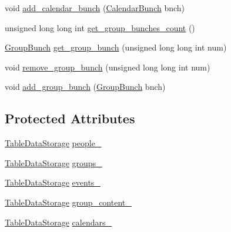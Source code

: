 \begin{DoxyCompactItemize}
void \hyperlink{classstorage_1_1DataStorage_ac7b4152086292d6a2b88d633c938140d}{add\_\-calendar\_\-bunch} (\hyperlink{structstorage_1_1CalendarBunch__}{CalendarBunch} bnch)
\item 
unsigned long long int \hyperlink{classstorage_1_1DataStorage_adc0bfcc5d6133e814f18d731fe8018e4}{get\_\-group\_\-bunches\_\-count} ()
\item 
\hyperlink{structstorage_1_1GroupBunch__}{GroupBunch} \hyperlink{classstorage_1_1DataStorage_a70227aa6c47733fe0a42e55cf8856f9a}{get\_\-group\_\-bunch} (unsigned long long int num)
\item 
void \hyperlink{classstorage_1_1DataStorage_a5d5028576d12a77bf51d2c66909c1a73}{remove\_\-group\_\-bunch} (unsigned long long int num)
\item 
void \hyperlink{classstorage_1_1DataStorage_a0b14b86856e2865845b249b53e960a9d}{add\_\-group\_\-bunch} (\hyperlink{structstorage_1_1GroupBunch__}{GroupBunch} bnch)
\end{DoxyCompactItemize}
\subsection*{Protected Attributes}
\begin{DoxyCompactItemize}
\item 
\hyperlink{classstorage_1_1TableDataStorage}{TableDataStorage} \hyperlink{classstorage_1_1DataStorage_a8c32de002329fa6018a0957c925cf183}{people\_\-}
\item 
\hyperlink{classstorage_1_1TableDataStorage}{TableDataStorage} \hyperlink{classstorage_1_1DataStorage_a08dbec98bdd6b7c3e6623a8bbe72235c}{groups\_\-}
\item 
\hyperlink{classstorage_1_1TableDataStorage}{TableDataStorage} \hyperlink{classstorage_1_1DataStorage_a16f699e52132096d7e8ec8d43c73ad1f}{events\_\-}
\item 
\hyperlink{classstorage_1_1TableDataStorage}{TableDataStorage} \hyperlink{classstorage_1_1DataStorage_ac49bf760dd1492eb566e7bbbf9d84743}{group\_\-content\_\-}
\item 
\hyperlink{classstorage_1_1TableDataStorage}{TableDataStorage} \hyperlink{classstorage_1_1DataStorage_adc094f1bdcad1fd0940c947d2b0529b9}{calendars\_\-}
\end{DoxyCompactItemize}


